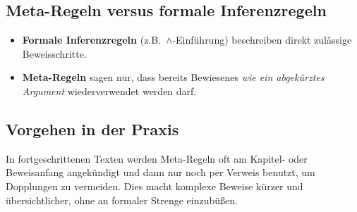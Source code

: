 \documentclass[main.tex]{subfiles}
\begin{document}
\subsection{Meta-Regeln versus formale Inferenzregeln}
\label{sec:metaRegelnVsInferenzregeln}
\begin{itemize}
\item \textbf{Formale Inferenzregeln} (z.B.\ $\land$-Einführung) beschreiben direkt zulässige Beweisschritte.
\item \textbf{Meta-Regeln} sagen nur, dass bereits Bewiesenes \emph{wie ein abgekürztes Argument} wiederverwendet werden darf.  
\end{itemize}

\subsection{Vorgehen in der Praxis}
In fortgeschrittenen Texten werden Meta-Regeln oft am Kapitel- oder Beweisanfang angekündigt und dann nur noch per Verweis benutzt, um Dopplungen zu vermeiden. Dies macht komplexe Beweise kürzer und übersichtlicher, ohne an formaler Strenge einzubüßen.
\end{document}
